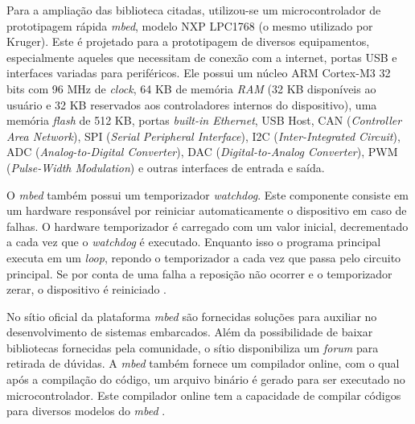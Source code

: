 
Para a ampliação das biblioteca citadas, utilizou-se um microcontrolador de prototipagem rápida \textit{mbed}, modelo NXP LPC1768 \cite{lpc1768:2016} (o mesmo utilizado por Kruger). Este é projetado para a prototipagem de diversos equipamentos, especialmente aqueles que necessitam de conexão com a internet, portas USB e interfaces variadas para periféricos. Ele possui um núcleo ARM Cortex-M3 32 bits com 96 MHz de \textit{clock}, 64 KB de memória \textit{RAM} (32 KB disponíveis ao usuário e 32 KB reservados aos controladores internos do dispositivo), uma memória \textit{flash} de 512 KB, portas \textit{built-in Ethernet}, USB Host, CAN (\textit{Controller Area Network}), SPI (\textit{Serial Peripheral Interface}), I2C (\textit{Inter-Integrated Circuit}), ADC (\textit{Analog-to-Digital Converter}), DAC (\textit{Digital-to-Analog Converter}), PWM (\textit{Pulse-Width Modulation}) e outras interfaces de entrada e saída.

O \textit{mbed} também possui um temporizador \textit{watchdog}. Este componente consiste em um hardware responsável por reiniciar automaticamente o dispositivo em caso de falhas. O hardware temporizador é carregado com um valor inicial, decrementado a cada vez que o \textit{watchdog} é executado. Enquanto isso o programa principal executa em um \textit{loop}, repondo o temporizador a cada vez que passa pelo circuito principal. Se por conta de uma falha a reposição não ocorrer e o temporizador zerar, o dispositivo é reiniciado \cite{mbedWhatdog:2016}.

No sítio oficial da plataforma \textit{mbed} são fornecidas soluções para auxiliar no desenvolvimento de sistemas embarcados. Além da possibilidade de baixar bibliotecas fornecidas pela comunidade, o sítio disponibiliza um \textit{forum} para retirada de dúvidas. A \textit{mbed} também fornece um compilador online, com o qual após a compilação do código, um arquivo binário é gerado para ser executado no microcontrolador. Este compilador online tem a capacidade de compilar códigos para diversos modelos do \textit{mbed} \cite{mbedCompiler:2016}.

